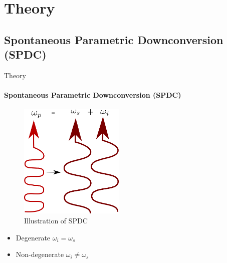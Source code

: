 \documentclass[serif,8pt]{beamer}
\begin{document}
\section{Theory}
\subsection{Spontaneous Parametric Downconversion (SPDC)}
\begin{frame}{Theory}
	\framesubtitle{Spontaneous Parametric Downconversion (SPDC)}
	\begin{minipage}[l]{0.60\textwidth}
		\begin{figure}
			\begin{center}
				\includegraphics[width=5cm]{SPDC.png}
			\end{center}
			\caption{Illustration of SPDC}
			\label{fig:SPDC}
		\end{figure}
	\end{minipage}
	\begin{minipage}[r]{0.35\textwidth}
		\begin{itemize}
			\item Degenerate $\omega_i = \omega_s$
			\item Non-degenerate $\omega_i \ne \omega_s$
		\end{itemize}
	\end{minipage}
\end{frame}
\end{document}
